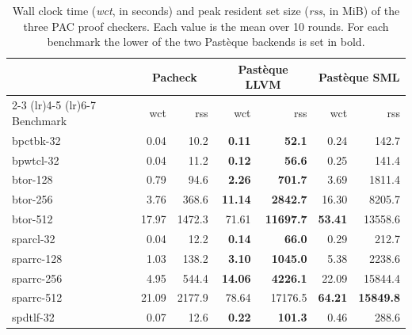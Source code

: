 \begin{table}[htbp]
  \centering
  \caption{Wall clock time (\emph{wct}, in seconds) and peak resident set size (\emph{rss}, in MiB) of the three PAC proof checkers. Each value is the mean over 10 rounds. For each benchmark the lower of the two Pastèque backends is set in bold.}
  \label{tab:checker-comparison}
  \begin{tabular}{l rr rr rr}
    \toprule
    & \multicolumn{2}{c}{Pacheck} & \multicolumn{2}{c}{Pastèque LLVM} & \multicolumn{2}{c}{Pastèque SML} \\
    \cmidrule(lr){2-3} \cmidrule(lr){4-5} \cmidrule(lr){6-7}
    Benchmark & wct & rss & wct & rss & wct & rss \\
    \midrule
    bpctbk-32 & 0.04 & 10.2 & \textbf{0.11} & \textbf{52.1} & 0.24 & 142.7 \\
    bpwtcl-32 & 0.04 & 11.2 & \textbf{0.12} & \textbf{56.6} & 0.25 & 141.4 \\
    btor-128 & 0.79 & 94.6 & \textbf{2.26} & \textbf{701.7} & 3.69 & 1811.4 \\
    btor-256 & 3.76 & 368.6 & \textbf{11.14} & \textbf{2842.7} & 16.30 & 8205.7 \\
    btor-512 & 17.97 & 1472.3 & 71.61 & \textbf{11697.7} & \textbf{53.41} & 13558.6 \\
    sparcl-32 & 0.04 & 12.2 & \textbf{0.14} & \textbf{66.0} & 0.29 & 212.7 \\
    sparrc-128 & 1.03 & 138.2 & \textbf{3.10} & \textbf{1045.0} & 5.38 & 2238.6 \\
    sparrc-256 & 4.95 & 544.4 & \textbf{14.06} & \textbf{4226.1} & 22.09 & 15844.4 \\
    sparrc-512 & 21.09 & 2177.9 & 78.64 & 17176.5 & \textbf{64.21} & \textbf{15849.8} \\
    spdtlf-32 & 0.07 & 12.6 & \textbf{0.22} & \textbf{101.3} & 0.46 & 288.6 \\
    \bottomrule
  \end{tabular}
\end{table}
